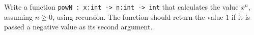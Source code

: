 Write a function \lstinline{powN : x:int -> n:int -> int} that calculates the
value $x^n$, assuming $n \geq 0$, using recursion. The function should
return the value $1$ if it is passed a negative value as its second argument.
